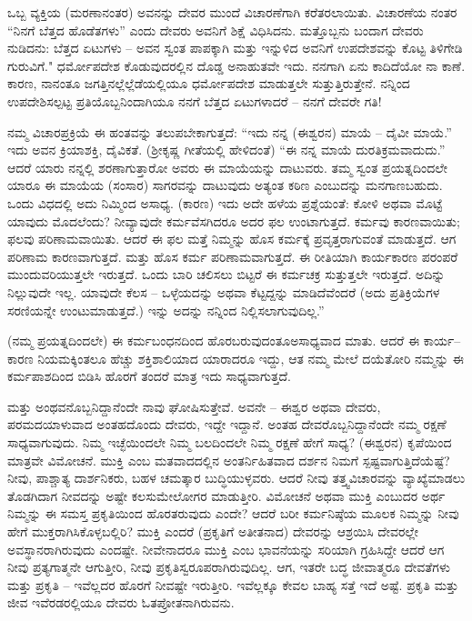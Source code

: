\vskip 4pt

ಒಬ್ಬ ವ್ಯಕ್ತಿಯ (ಮರಣಾನಂತರ) ಅವನನ್ನು ದೇವರ ಮುಂದೆ ವಿಚಾರಣೆಗಾಗಿ ಕರೆತರಲಾಯಿತು. ವಿಚಾರಣೆಯ ನಂತರ “ನಿನಗೆ  ಬೆತ್ತದ ಹೊಡೆತಗಳು'' ಎಂದು ದೇವರು ಅವನಿಗೆ ಶಿಕ್ಷೆ ವಿಧಿಸಿದನು. ಮತ್ತೊಬ್ಬನು ಬಂದಾಗ ದೇವರು ನುಡಿದನು:  ಬೆತ್ತದ ಏಟುಗಳು –  ಅವನ ಸ್ವಂತ ಪಾಪಕ್ಕಾಗಿ ಮತ್ತು ಇನ್ನುಳಿದ  ಅವನಿಗೆ ಉಪದೇಶವನ್ನು ಕೊಟ್ಟ ತಿಳಿಗೇಡಿ ಗುರುವಿಗೆ." ಧರ್ಮೋಪದೇಶ ಕೊಡುವುದರಲ್ಲಿನ ದೊಡ್ಡ ಅನಾಹುತವೇ ಇದು. ನನಗಾಗಿ ಏನು ಕಾದಿದೆಯೋ ನಾ ಕಾಣೆ. ಕಾರಣ, ನಾನಂತೂ ಜಗತ್ತಿನಲ್ಲೆಲ್ಲೆಡೆಯಲ್ಲಿಯೂ ಧರ್ಮೋಪದೇಶ ಮಾಡುತ್ತಲೇ ಸುತ್ತುತ್ತಿರುತ್ತೇನೆ. ನನ್ನಿಂದ ಉಪದೇಶಿಸಲ್ಪಟ್ಟ ಪ್ರತಿಯೊಬ್ಬನಿಂದಾಗಿಯೂ ನನಗೆ  ಬೆತ್ತದ ಏಟುಗಳಾದರೆ – ನನಗೆ ದೇವರೇ ಗತಿ!

\vskip 4pt

ನಮ್ಮ ವಿಚಾರಪ್ರಕ್ರಿಯೆ ಈ ಹಂತವನ್ನು ತಲುಪಬೇಕಾಗುತ್ತದೆ: “ಇದು ನನ್ನ (ಈಶ್ವರನ) ಮಾಯೆ – ದೈವೀ ಮಾಯೆ.'' ಇದು ಅವನ ಕ್ರಿಯಾಶಕ್ತಿ, ದೈವಿಕತೆ. (ಶ‍್ರೀಕೃಷ್ಣ ಗೀತೆಯಲ್ಲಿ ಹೇಳಿದಂತೆ) “ಈ ನನ್ನ ಮಾಯೆ ದುರತಿಕ್ರಮವಾದುದು.” ಆದರೆ ಯಾರು ನನ್ನಲ್ಲಿ ಶರಣಾಗುತ್ತಾರೋ ಅವರು ಈ ಮಾಯೆಯನ್ನು ದಾಟುವರು. ತಮ್ಮ ಸ್ವಂತ ಪ್ರಯತ್ನದಿಂದಲೇ ಯಾರೂ ಈ ಮಾಯೆಯ (ಸಂಸಾರ) ಸಾಗರವನ್ನು ದಾಟುವುದು ಅತ್ಯಂತ ಕಠಿಣ ಎಂಬುದನ್ನು ಮನಗಾಣಬಹುದು. ಒಂದು ವಿಧದಲ್ಲಿ ಅದು ನಿಮ್ಮಿಂದ ಅಸಾಧ್ಯ. (ಕಾರಣ) ಇದು ಅದೇ ಹಳೆಯ ಪ್ರಶ್ನೆಯಂತೆ: ಕೋಳಿ ಅಥವಾ ಮೊಟ್ಟೆ ಯಾವುದು ಮೊದಲೆಂದು? ನೀವ್ಯಾವುದೇ ಕರ್ಮವೆಸಗಿದರೂ ಅದರ ಫಲ ಉಂಟಾಗುತ್ತದೆ. ಕರ್ಮವು ಕಾರಣವಾಯಿತು; ಫಲವು ಪರಿಣಾಮವಾಯಿತು. ಆದರೆ ಈ ಫಲ ಮತ್ತೆ ನಿಮ್ಮನ್ನು ಹೊಸ ಕರ್ಮಕ್ಕೆ ಪ್ರವೃತ್ತರಾಗುವಂತೆ ಮಾಡುತ್ತದೆ. ಆಗ ಪರಿಣಾಮ ಕಾರಣವಾಗುತ್ತದೆ. ಮತ್ತು ಹೊಸ ಕರ್ಮ ಪರಿಣಾಮವಾಗುತ್ತದೆ. ಈ ರೀತಿಯಾಗಿ ಕಾರ್ಯಕಾರಣ ಪರಂಪರೆ ಮುಂದುವರಿಯುತ್ತಲೇ ಇರುತ್ತದೆ. ಒಂದು ಬಾರಿ ಚಲಿಸಲು ಬಿಟ್ಟರೆ ಈ ಕರ್ಮಚಕ್ರ ಸುತ್ತುತ್ತಲೇ ಇರುತ್ತದೆ. ಅದಿನ್ನು ನಿಲ್ಲುವುದೇ ಇಲ್ಲ. ಯಾವುದೇ ಕೆಲಸ – ಒಳ್ಳೆಯದನ್ನು ಅಥವಾ ಕೆಟ್ಟದ್ದನ್ನು ಮಾಡಿದೆವೆಂದರೆ (ಅದು ಪ್ರತಿಕ್ರಿಯೆಗಳ ಸರಣಿಯನ್ನೇ ಉಂಟುಮಾಡುತ್ತದೆ.) ಇನ್ನು ಅದನ್ನು ನನ್ನಿಂದ ನಿಲ್ಲಿಸಲಾಗುವುದಿಲ್ಲ.”

\vskip 4pt

(ನಮ್ಮ ಪ್ರಯತ್ನದಿಂದಲೇ) ಈ ಕರ್ಮಬಂಧನದಿಂದ ಹೊರಬರುವುದಂತೂ\break ಅಸಾಧ್ಯವಾದ ಮಾತು. ಆದರೆ ಈ ಕಾರ್ಯ–ಕಾರಣ ನಿಯಮಕ್ಕಿಂತಲೂ ಹೆಚ್ಚು ಶಕ್ತಿಶಾಲಿಯಾದ ಯಾರಾದರೂ ಇದ್ದು, ಆತ ನಮ್ಮ ಮೇಲೆ ದಯೆತೋರಿ ನಮ್ಮನ್ನು ಈ ಕರ್ಮಪಾಶದಿಂದ ಬಿಡಿಸಿ ಹೊರಗೆ ತಂದರೆ ಮಾತ್ರ ಇದು ಸಾಧ್ಯವಾಗುತ್ತದೆ.

\vskip 4pt

ಮತ್ತು ಅಂಥವನೊಬ್ಬನಿದ್ದಾನೆಂದೇ ನಾವು ಘೋಷಿಸುತ್ತೇವೆ. ಅವನೇ – ಈಶ್ವರ ಅಥವಾ ದೇವರು, ಪರಮದಯಾಳುವಾದ ಅಂತಹದೊಂದು ದೇವರು, ಇದ್ದೇ ಇದ್ದಾನೆ. ಅಂತಹ ದೇವರೊಬ್ಬನಿದ್ದಾನೆಂದೇ ನಮ್ಮ ರಕ್ಷಣೆ ಸಾಧ್ಯವಾಗುವುದು. ನಿಮ್ಮ ಇಚ್ಛೆಯಿಂದಲೇ ನಿಮ್ಮ ಬಲದಿಂದಲೇ ನಿಮ್ಮ ರಕ್ಷಣೆ ಹೇಗೆ ಸಾಧ್ಯ? (ಈಶ್ವರನ) ಕೃಪೆಯಿಂದ ಮಾತ್ರವೇ ವಿಮೋಚನೆ. ಮುಕ್ತಿ ಎಂಬ ಮತವಾದದಲ್ಲಿನ ಅಂತರ್ನಿಹಿತವಾದ ದರ್ಶನ ನಿಮಗೆ ಸ್ಪಷ್ಟವಾಗುತ್ತಿದೆಯೆಷ್ಟೆ? ನೀವು, ಪಾಶ್ಚಾತ್ಯ ದಾರ್ಶನಿಕರು, ಬಹಳ ಚಮತ್ಕಾರ ಬುದ್ಧಿಯುಳ್ಳವರು. ಆದರೆ ನೀವು ತತ್ತ್ವವಿಚಾರವನ್ನು ವ್ಯಾಖ್ಯೆಮಾಡಲು ತೊಡಗಿದಾಗ ನೀವದನ್ನು ಅಷ್ಟೇ ಕಲಸುಮೇಲೋಗರ ಮಾಡುತ್ತೀರಿ. ವಿಮೋಚನೆ ಅಥವಾ ಮುಕ್ತಿ ಎಂಬುದರ ಅರ್ಥ ನಿಮ್ಮನ್ನು ಈ ಸಮಸ್ತ ಪ್ರಕೃತಿಯಿಂದ ಹೊರತರುವುದು ಎಂದೇ? ಆದರೆ ಬರೀ ಕರ್ಮನಿಷ್ಠೆಯ ಮೂಲಕ ನಿಮ್ಮನ್ನು ನೀವು ಹೇಗೆ ಮುಕ್ತರಾಗಿಸಿಕೊಳ್ಳಬಲ್ಲಿರಿ? ಮುಕ್ತಿ ಎಂದರೆ (ಪ್ರಕೃತಿಗೆ ಅತೀತನಾದ) ದೇವರನ್ನು ಆಶ್ರಯಿಸಿ ದೇವರಲ್ಲೇ ಅವಸ್ಥಾನರಾಗಿರುವುದು ಎಂದಷ್ಟೇ. ನೀವೇನಾದರೂ ಮುಕ್ತಿ ಎಂಬ ಭಾವನೆಯನ್ನು ಸರಿಯಾಗಿ ಗ್ರಹಿಸಿದ್ದೇ ಆದರೆ ಆಗ ನೀವು ಪ್ರತ್ಯಗಾತ್ಮನೇ ಆಗುತ್ತೀರಿ, ನೀವು ಪ್ರಕೃತಿಸ್ವರೂಪರಾಗಿರುವುದಿಲ್ಲ. ಆಗ, ಇತರೇ ಬದ್ಧ ಜೀವಾತ್ಮರೂ ದೇವತೆಗಳು ಮತ್ತು ಪ್ರಕೃತಿ – ಇವೆಲ್ಲದರ ಹೊರಗೆ ನೀವಷ್ಟೇ ಇರುತ್ತೀರಿ. ಇವೆಲ್ಲಕ್ಕೂ ಕೇವಲ ಬಾಹ್ಯ ಸತ್ತೆ ಇದೆ ಅಷ್ಟೆ. ಪ್ರಕೃತಿ ಮತ್ತು ಜೀವ ಇವೆರಡರಲ್ಲಿಯೂ ದೇವರು ಓತಪ್ರೋತನಾಗಿರುವನು.

